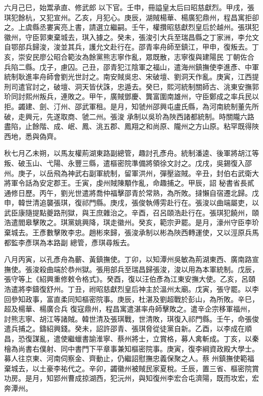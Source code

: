 \begin{pinyinscope}
 六月己巳，始鬻承直、修武郎
 以下官。壬申，冊謚皇太后曰昭慈獻烈。甲戌，張琪犯餘杭，又犯宣州。乙亥，月犯心。庚辰，湖賊楊華、楊廣犯鼎州，程昌寓拒卻之。上虞縣丞婁寅亮上書，請選立繼嗣。壬午，權攢昭慈獻烈皇后於越州。張琪犯徽州，守臣郭東棄城去，琪入據之。癸未，張浚引大兵至瑞昌縣之丁家洲，李允文自鄂部兵歸浚，浚並其兵，護允文赴行在。邵青率舟師至鎮江，甲申，復叛去。丁亥，崇安民廖公昭合範汝為餘黨熊志寧作亂，眾既散，志寧復與建陽民
 丁朝佐合兵陷二縣。戊子，慮囚。己丑，邵青犯江陰軍之福山，遣海州鎮撫使李進彥、中軍統制耿進率舟師會劉光世討之。南安賊吳忠、宋破壇、劉洞天作亂。庚寅，江西提刑司遣官討之，破壇、洞天皆伏誅，忠遁去。癸巳，熙河統制關師古、洮東安撫郭玠同討熙州叛兵，連敗之。甲午，廣賊鄧慶、龔富圍南雄州，守臣鄭成之率兵民以拒。蠲建、劍、汀州、邵武軍租。是月，知虢州邵興屯盧氏縣，為河南統制董先所破，走興元，先遂取商、虢二州。張浚
 承制以吳玠為陜西諸都統制。時關隴六路盡陷，止餘階、成、岷、鳳、洮五郡、鳳翔之和尚原、隴州之方山原。粘罕既得陜西地，悉與偽齊。



 秋七月乙未朔，以馬友權荊湖東路副總管，趣討孔彥舟。統制潘逵、後軍將胡江等叛、破玉山、弋陽、永豐三縣，遣樞密院準備將領徐文討之。戊戌，吳錫復入邵州。庚子，以岳飛為神武右副軍統制，留軍洪州，彈壓盜賊。辛丑，封伯右武衛大將軍令話為安定郡王。壬寅，虔州賊陳顒作亂，命趣捕之。甲辰，詔
 秘書省長貳通修日歷。丙午，劉光世遣將喬仲福擊邵青於常熟，為所敗。撻懶自宿遷北歸。戊申，韓世清追襲張琪，復祁門縣。庚戌，張俊執傅雱赴行在。張浚以曲端屬吏，以武臣康隨提點夔路刑獄，與王庶雜治之。辛酉，召呂頤浩赴行在。張琪犯饒州，頤浩遣閻皋擊敗之。琪黨姚興降，琪走徽州。癸亥，範宗尹罷。是月，濠州守臣李玠棄城去。王彥數擊敗李忠。趙彬來歸，張浚承制以彬為陜西轉運使，又以涇原兵馬都監李彥琪為本路副
 總管，彥琪尋叛去。



 八月丙寅，以孔彥舟為蘄、黃鎮撫使。丁卯，以知潭州吳敏為荊湖東西、廣南路宣撫使。張浚殺曲端於恭州獄。張用部兵至瑞昌歸張浚，浚以用為本軍統制。戊辰，張守等上《紹興重修敕令格式》。癸酉，復以汪伯彥為江東安撫大使。乙亥，呂頤浩遣將李鑄復舒州。丁丑，祔昭慈獻烈皇后神主於溫州太廟。戊寅，張守罷。以李回參知政事，富直柔同知樞密院事。庚辰，杜湛及劉超戰於彭山，為所敗。辛巳，超及楊華、楊廣合兵
 復寇鼎州，程昌寓遣湛率舟師擊敗之。遣辛企宗移軍福州，討熊志寧、胡江等諸賊。韓世清及張琪戰，世清敗，琪復入祁門縣。壬午，命張俊遣兵捕之。鑄紹興錢。癸未，詔許邵青、張琪脅從徒黨自新。乙酉，以李成在順昌，恐復謀亂，遣使繼蠟書諭淮寧、蔡州將士，立賞格，募人禽斬成。丁亥，以秦檜為尚書右僕射、同中書門下平章事兼知樞密院事。庚寅，復李綱資政殿大學士。募人往京東、河南伺察金、齊動止，仍繼詔慰撫忠義保聚之人。蔡
 州鎮撫使範福棄城去，以土豪李祐代之。辛卯，蠲徽州被賊民家夏稅。壬辰，置三省、樞密院賞功房。是月，知郢州曹成掠湖西，犯沅州，與知復州李宏合屯濟陽，既而攻宏，宏奔潭州。




\end{pinyinscope}
